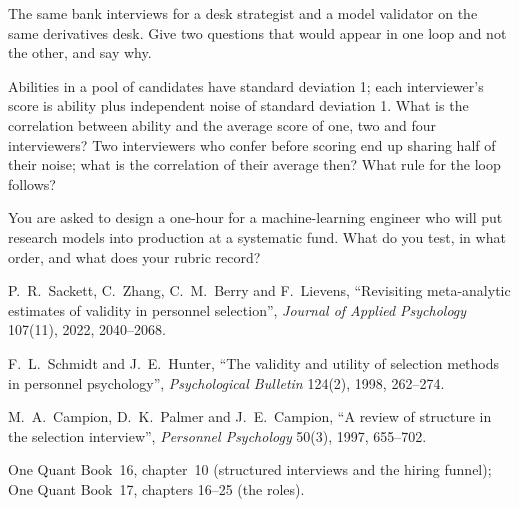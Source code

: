 \begin{interviewq}\label{iq:iv:what-each-interview-tests-by-role:6}
The same bank interviews for a desk strategist and a model validator on the same derivatives desk. Give two
questions that would appear in one loop and not the other, and say why.
\end{interviewq}

\begin{interviewq}\label{iq:iv:what-each-interview-tests-by-role:7}
Abilities in a pool of candidates have standard deviation 1; each interviewer's score is ability plus
independent noise of standard deviation 1. What is the correlation between ability and the average score of
one, two and four interviewers? Two interviewers who confer before scoring end up sharing half of their noise;
what is the correlation of their average then? What rule for the loop follows?
\end{interviewq}

\begin{interviewq}\label{iq:iv:what-each-interview-tests-by-role:8}
You are asked to design a one-hour  for a machine-learning engineer who will put research
models into production at a systematic fund. What do you test, in what order, and what does your rubric
record?
\end{interviewq}

\begin{omsources}
\item P.~R.~Sackett, C.~Zhang, C.~M.~Berry and F.~Lievens, ``Revisiting meta-analytic estimates of validity in
personnel selection'', \emph{Journal of Applied Psychology} 107(11), 2022, 2040--2068.
\item F.~L.~Schmidt and J.~E.~Hunter, ``The validity and utility of selection methods in personnel psychology'',
\emph{Psychological Bulletin} 124(2), 1998, 262--274.
\item M.~A.~Campion, D.~K.~Palmer and J.~E.~Campion, ``A review of structure in the selection interview'',
\emph{Personnel Psychology} 50(3), 1997, 655--702.
\item One Quant Book~16, chapter~10 (structured interviews and the hiring funnel); One Quant Book~17,
chapters 16--25 (the roles).
\end{omsources}
